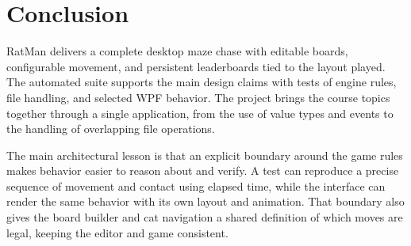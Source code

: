 \clearpage
\section{Conclusion}

RatMan delivers a complete desktop maze chase with editable boards, configurable movement, and persistent leaderboards tied to the layout played. The automated suite supports the main design claims with tests of engine rules, file handling, and selected WPF behavior. The project brings the course topics together through a single application, from the use of value types and events to the handling of overlapping file operations.

The main architectural lesson is that an explicit boundary around the game rules makes behavior easier to reason about and verify. A test can reproduce a precise sequence of movement and contact using elapsed time, while the interface can render the same behavior with its own layout and animation. That boundary also gives the board builder and cat navigation a shared definition of which moves are legal, keeping the editor and game consistent.
